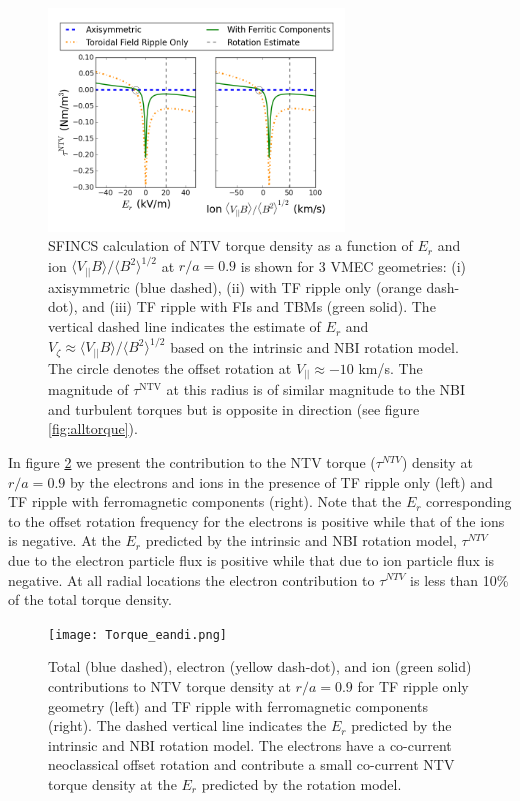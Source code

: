 \documentclass[aip, pop, preprint]{revtex4-1}
\numberwithin{figure}{section}
\numberwithin{equation}{section}
\begin{document}
\begin{figure}[h!]
\centering
\includegraphics[width=0.7\textwidth]{Torque_ErandV.png}
\caption{\label{fig:Torque_ErandV} SFINCS calculation of NTV torque density as a function of $E_r$ and ion $\langle V_{||} B \rangle/\langle B^2 \rangle^{1/2}$ at $r/a = 0.9$ is shown for 3 VMEC geometries: (i) axisymmetric (blue dashed), (ii) with TF ripple only (orange dash-dot), and (iii) TF ripple with FIs and TBMs (green solid). The vertical dashed line indicates the estimate of $E_r$ and $V_{\zeta} \approx \langle V_{||} B \rangle/\langle B^2 \rangle^{1/2}$ based on the intrinsic and NBI rotation model. The circle denotes the offset rotation at $V_{||} \approx -10$ km/s. The magnitude of $\tau^{\text{NTV}}$ at this radius is of similar magnitude to the NBI and turbulent torques but is opposite in direction (see figure \ref{fig:alltorque}).}
\end{figure}

In figure \ref{fig:Torque_eandi} we present the contribution to the NTV torque ($\tau^{NTV}$) density at $r/a = 0.9$ by the electrons and ions in the presence of TF ripple only (left) and TF ripple with ferromagnetic components (right). Note that the $E_r$ corresponding to the offset rotation frequency for the electrons is positive while that of the ions is negative. At the $E_r$ predicted by the intrinsic and NBI rotation model, $\tau^{NTV}$ due to the electron particle flux is positive while that due to ion particle flux is negative. At all radial locations the electron contribution to $\tau^{NTV}$ is less than 10\% of the total torque density. 

\begin{figure}[h!]
\centering
\texttt{[image: Torque\_eandi.png]}
\caption{\label{fig:Torque_eandi} Total (blue dashed), electron (yellow dash-dot), and ion (green solid) contributions to NTV torque density at $r/a = 0.9$ for TF ripple only geometry (left) and TF ripple with ferromagnetic components (right). The dashed vertical line indicates the $E_r$ predicted by the intrinsic and NBI rotation model. The electrons have a co-current neoclassical offset rotation and contribute a small co-current NTV torque density at the $E_r$ predicted by the rotation model.}
\end{figure}
\end{document}
